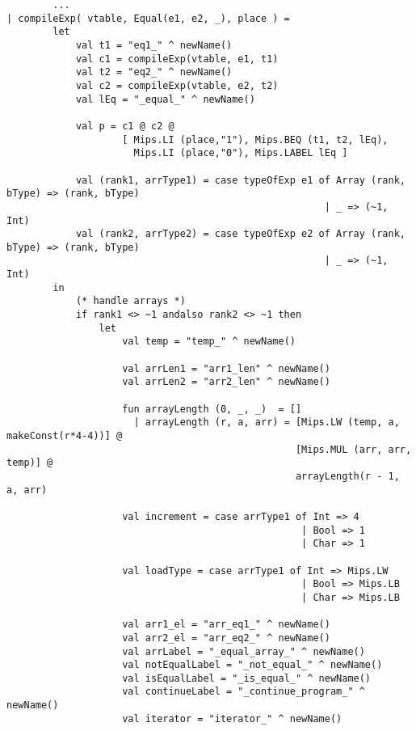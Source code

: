 \documentclass[12pt]{article}
\begin{document}
\begin{lstlisting}
        ...
| compileExp( vtable, Equal(e1, e2, _), place ) =
        let 
            val t1 = "eq1_" ^ newName()
            val c1 = compileExp(vtable, e1, t1)
            val t2 = "eq2_" ^ newName()
            val c2 = compileExp(vtable, e2, t2)
            val lEq = "_equal_" ^ newName()
        
            val p = c1 @ c2 @ 
                    [ Mips.LI (place,"1"), Mips.BEQ (t1, t2, lEq),
                      Mips.LI (place,"0"), Mips.LABEL lEq ]

            val (rank1, arrType1) = case typeOfExp e1 of Array (rank, bType) => (rank, bType)
                                                       | _ => (~1, Int)
            val (rank2, arrType2) = case typeOfExp e2 of Array (rank, bType) => (rank, bType)
                                                       | _ => (~1, Int)                              
        in
            (* handle arrays *)
            if rank1 <> ~1 andalso rank2 <> ~1 then
                let
                    val temp = "temp_" ^ newName()
                                       
                    val arrLen1 = "arr1_len" ^ newName()
                    val arrLen2 = "arr2_len" ^ newName()

                    fun arrayLength (0, _, _)  = []
                      | arrayLength (r, a, arr) = [Mips.LW (temp, a, makeConst(r*4-4))] @
                                                  [Mips.MUL (arr, arr, temp)] @
                                                  arrayLength(r - 1, a, arr)

                    val increment = case arrType1 of Int => 4
                                                   | Bool => 1
                                                   | Char => 1
                    
                    val loadType = case arrType1 of Int => Mips.LW
                                                   | Bool => Mips.LB
                                                   | Char => Mips.LB

                    val arr1_el = "arr_eq1_" ^ newName()
                    val arr2_el = "arr_eq2_" ^ newName() 
                    val arrLabel = "_equal_array_" ^ newName()
                    val notEqualLabel = "_not_equal_" ^ newName()
                    val isEqualLabel = "_is_equal_" ^ newName()
                    val continueLabel = "_continue_program_" ^ newName()
                    val iterator = "iterator_" ^ newName()


\end{lstlisting}
\end{document}

